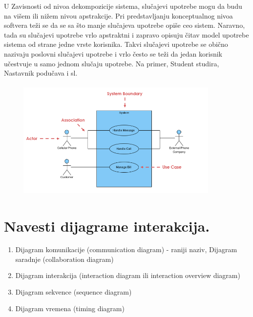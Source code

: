 \documentclass[a4paper]{article}
\begin{document}
  U Zavisnosti od nivoa dekompozicije sistema, slučajevi upotrebe mogu da budu
  na višem ili nižem nivou apstrakcije. Pri predstavljanju konceptualnog nivoa
  softvera teži se da se sa što manje slučajeva upotrebe opiše ceo sistem. Naravno, tada
  su slučajevi upotrebe vrlo apstraktni i zapravo opisuju čitav model upotrebe sistema
  od strane jedne vrste korisnika. Takvi slučajevi upotrebe se obično nazivaju poslovni
  slučajevi upotrebe i vrlo često se teži da jedan korisnik učestvuje u samo jednom
  slučaju upotrebe. Na primer, Student studira, Nastavnik podučava i sl.\\
  \begin{figure}[H]
    \begin{center}
        \includegraphics[width=100mm,height=60mm]{Slike/uml_slucaj_upotrebe.png}
    \end{center}
  \end{figure}

\section{Navesti dijagrame interakcija.}
  \begin{enumerate}
    \item Dijagram komunikacije (communication diagram) 
          - raniji naziv, Dijagram saradnje (collaboration diagram)
    \item Dijagram interakcija (interaction diagram ili interaction overview diagram)
    \item Dijagram sekvence (sequence diagram)
    \item Dijagram vremena (timing diagram)
  \end{enumerate}
\end{document}
